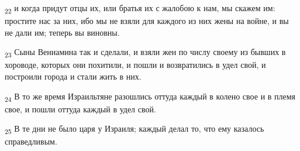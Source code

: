 \begin{tcolorbox}
\textsubscript{22} и когда придут отцы их, или братья их с жалобою к нам, мы скажем им: простите нас за них, ибо мы не взяли для каждого из них жены на войне, и вы не дали им; теперь вы виновны.
\end{tcolorbox}
\begin{tcolorbox}
\textsubscript{23} Сыны Вениамина так и сделали, и взяли жен по числу своему из бывших в хороводе, которых они похитили, и пошли и возвратились в удел свой, и построили города и стали жить в них.
\end{tcolorbox}
\begin{tcolorbox}
\textsubscript{24} В то же время Израильтяне разошлись оттуда каждый в колено свое и в племя свое, и пошли оттуда каждый в удел свой.
\end{tcolorbox}
\begin{tcolorbox}
\textsubscript{25} В те дни не было царя у Израиля; каждый делал то, что ему казалось справедливым.
\end{tcolorbox}

